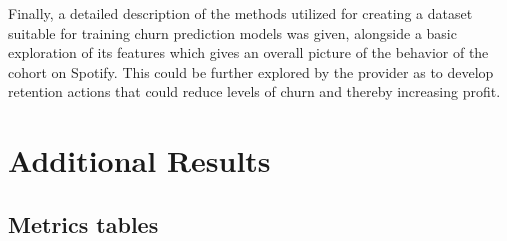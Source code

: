 \documentclass{kththesis}
\begin{document}
Finally, a detailed description of the methods utilized for creating a dataset suitable for training churn prediction models was given, alongside a basic exploration of its features which gives an overall picture of the behavior of the cohort on Spotify. This could be further explored by the provider as to develop retention actions that could reduce levels of churn and thereby increasing profit.  



\appendix

\chapter{Additional Results}
\label{chap:add_results}

\section{Metrics tables}

\end{document}
